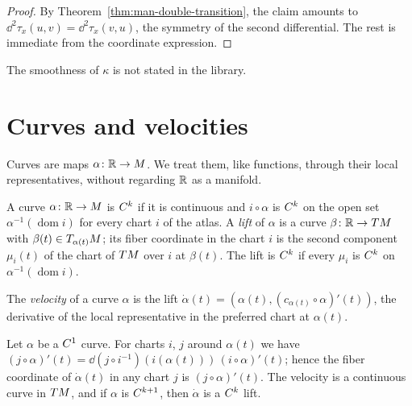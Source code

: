 \begin{proof}
  \leanok
  By Theorem~\ref{thm:man-double-transition}, the claim amounts to $\dd^2\tau_x(u, v) =
  \dd^2\tau_x(v, u)$, the symmetry of the second differential. The rest is immediate from the
  coordinate expression.
\end{proof}

The smoothness of $\kappa$ is not stated in the library.

\section{Curves and velocities}

Curves are maps $\alpha \colon \mathbb{R} \to M$. We treat them, like functions, through their local
representatives, without regarding $\mathbb{R}$ as a manifold.

\begin{definition}
  \label{def:ck-curve}
  \leanok
  A curve $\alpha \colon \mathbb{R} \to M$ is $C^{k}$ if it is continuous and $i \circ \alpha$ is
  $C^{k}$ on the open set $\alpha^{-1}(\operatorname{dom} i)$ for every chart $i$ of the atlas. A
  \emph{lift} of $\alpha$ is a curve $\beta \colon \mathbb{R} \to T M$ with $\beta(t) \in T_{\alpha(t)}
  M$; its fiber coordinate in the chart $i$ is the second component $\mu_i(t)$ of the chart of
  $T M$ over $i$ at $\beta(t)$. The lift is $C^{k}$ if every $\mu_i$ is $C^{k}$ on
  $\alpha^{-1}(\operatorname{dom} i)$.
\end{definition}

\begin{definition}[Velocity]
  \label{def:velocity}
  \leanok
  The \emph{velocity} of a curve $\alpha$ is the lift $\dot\alpha(t) = (\alpha(t),
  (c_{\alpha(t)} \circ \alpha)'(t))$, the derivative of the local representative in the preferred
  chart at $\alpha(t)$.
\end{definition}

\begin{theorem}
  \label{thm:man-velocity}
  \leanok
  Let $\alpha$ be a $C^{1}$ curve. For charts $i$, $j$ around $\alpha(t)$ we have
  $(j \circ \alpha)'(t) = \dd(j \circ i^{-1})(i(\alpha(t)))\,(i \circ \alpha)'(t)$; hence the fiber
  coordinate of $\dot\alpha(t)$ in any chart $j$ is $(j \circ \alpha)'(t)$. The velocity is a
  continuous curve in $T M$, and if $\alpha$ is $C^{k+1}$, then $\dot\alpha$ is a $C^{k}$ lift.
\end{theorem}

